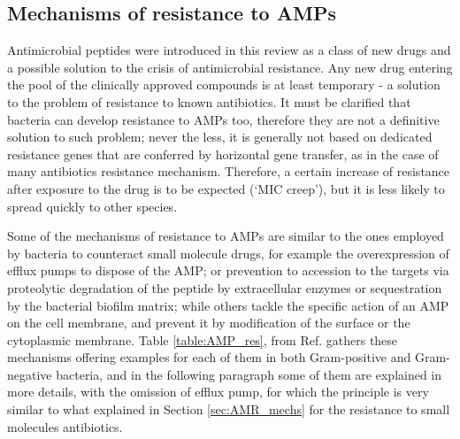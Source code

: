 \documentclass[a4paper,11pt]{extreport}
\begin{document}
\subsection{Mechanisms of resistance to AMPs}

Antimicrobial peptides were introduced in this review as a class of new drugs and a possible solution to the crisis of antimicrobial resistance. Any new drug entering the pool of the clinically approved compounds is at least temporary - a solution to the problem of resistance to known antibiotics. It must be clarified that bacteria can develop resistance to AMPs too, therefore they are not a definitive solution to such problem; never the less, it is generally not based on dedicated resistance genes that are conferred by horizontal gene transfer, as in the case of many antibiotics resistance mechanism.\cite{Peschel2006,Juhas2015}
Therefore, a certain increase of resistance after exposure to the drug is to be expected (‘MIC creep’), %
but it is less likely to spread quickly to other species.

Some of the mechanisms of resistance to AMPs are similar to the ones employed by bacteria to counteract small molecule drugs, for example the overexpression of efflux pumps to dispose of the AMP; or prevention to accession to the targets via proteolytic degradation of the peptide by extracellular enzymes or sequestration by the bacterial biofilm matrix; while others tackle the specific action of an AMP on the cell membrane, and prevent it by modification of the surface or the cytoplasmic membrane. Table \ref{table:AMP_res}, from Ref. \cite{Joo2016} gathers these mechanisms offering examples for each of them in both Gram-positive and Gram-negative bacteria, and in the following paragraph some of them are explained in more details, with the omission of efflux pump, for which the principle is very similar to what explained in Section \ref{sec:AMR_mechs} for the resistance to small molecules antibiotics.
\end{document}
